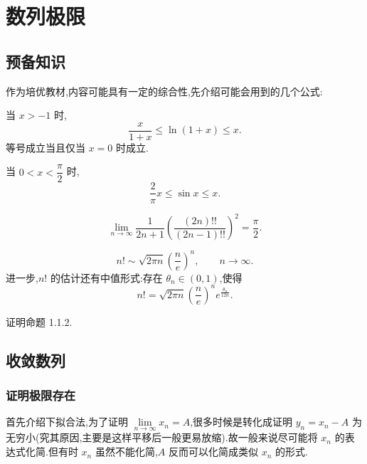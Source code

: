 \documentclass[../数学分析培优讲义.tex]{subfiles}
\begin{document}
\setcounter{chapter}{0}
\pagestyle{fancy}

\chapter{数列极限}


\section{预备知识}

作为培优教材,内容可能具有一定的综合性,先介绍可能会用到的几个公式:

\begin{proposition}
当 $x>-1$ 时,
\[
\dfrac{x}{1+x}\leq \ln(1+x)\leq x.
\]
等号成立当且仅当 $x=0$ 时成立.
\end{proposition}

\begin{proposition}[\marktwostar]
当 $0<x<\dfrac{\pi}{2}$ 时,
\[
\dfrac{2}{\pi}x\leq \sin x\leq x.
\]
\end{proposition}

\begin{theorem}
\[
\lim\limits_{n\to\infty}
\dfrac{1}{2n+1}
\left(\dfrac{(2n)!!}{(2n-1)!!}\right)^2
=\dfrac{\pi}{2}.
\]
\end{theorem}

\begin{theorem}
\[
n!\sim \sqrt{2\pi n}\left(\dfrac{n}{e}\right)^n,
\qquad n\to\infty.
\]
进一步,$n!$ 的估计还有中值形式:存在 $\theta_n\in(0,1)$,使得
\[
n!
=\sqrt{2\pi n}\left(\dfrac{n}{e}\right)^n
 e^{\frac{\theta_n}{12n}}.
\]
\end{theorem}

\begin{example}
证明命题 1.1.2.
\end{example}
\exampleblank


\newpage

\section{收敛数列}


\subsection{证明极限存在}



首先介绍下拟合法,为了证明 $\displaystyle \lim\limits_{n\to\infty}x_n=A$,很多时候是转化成证明
$y_n=x_n-A$ 为无穷小(究其原因,主要是这样平移后一般更易放缩).故一般来说尽可能将
$x_n$ 的表达式化简.但有时 $x_n$ 虽然不能化简,$A$ 反而可以化简成类似 $x_n$ 的形式.
\end{document}
